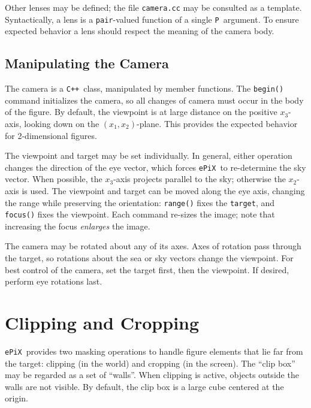 \documentclass[12pt]{report}
\newcommand{\code}[1]{\texttt{#1}}
\newcommand{\filename}[1]{\texttt{#1}}
\newcommand{\ePiX}{\code{ePiX}}
\newcommand{\CXX}{\code{C++}}
\begin{document}
Other lenses may be defined; the file \filename{camera.cc} may be
consulted as a template. Syntactically, a lens is a \code{pair}-valued
function of a single \code{P}~argument. To ensure expected behavior a
lens should respect the meaning of the camera body.


\subsection*{Manipulating the Camera}

The camera is a \CXX\ class, manipulated by member functions.  The
\code{begin()} command initializes the camera, so all changes of
camera must occur in the body of the figure. By default, the viewpoint
is at large distance on the positive $x_3$-axis, looking down on the
$(x_1,x_2)$-plane. This provides the expected behavior for
2-dimensional figures.

The viewpoint and target may be set individually. In general, either
operation changes the direction of the eye vector, which forces \ePiX\ 
to re-determine the sky vector. When possible, the $x_3$-axis projects
parallel to the sky; otherwise the $x_2$-axis is used.  The viewpoint
and target can be moved along the eye axis, changing the range while
preserving the orientation: \code{range()} fixes the \code{target},
and \code{focus()} fixes the viewpoint. Each command re-sizes the
image; note that increasing the focus \emph{enlarges} the image.

The camera may be rotated about any of its axes. Axes of rotation pass
through the target, so rotations about the sea or sky vectors change
the viewpoint. For best control of the camera, set the target first,
then the viewpoint. If desired, perform eye rotations last.


\section{Clipping and Cropping}

\ePiX\ provides two masking operations to handle figure elements that
lie far from the target: clipping (in the world) and cropping (in the
screen).  The ``clip box'' may be regarded as a set of ``walls''.
When clipping is active, objects outside the walls are not visible. By
default, the clip box is a large cube centered at the origin.
\end{document}
